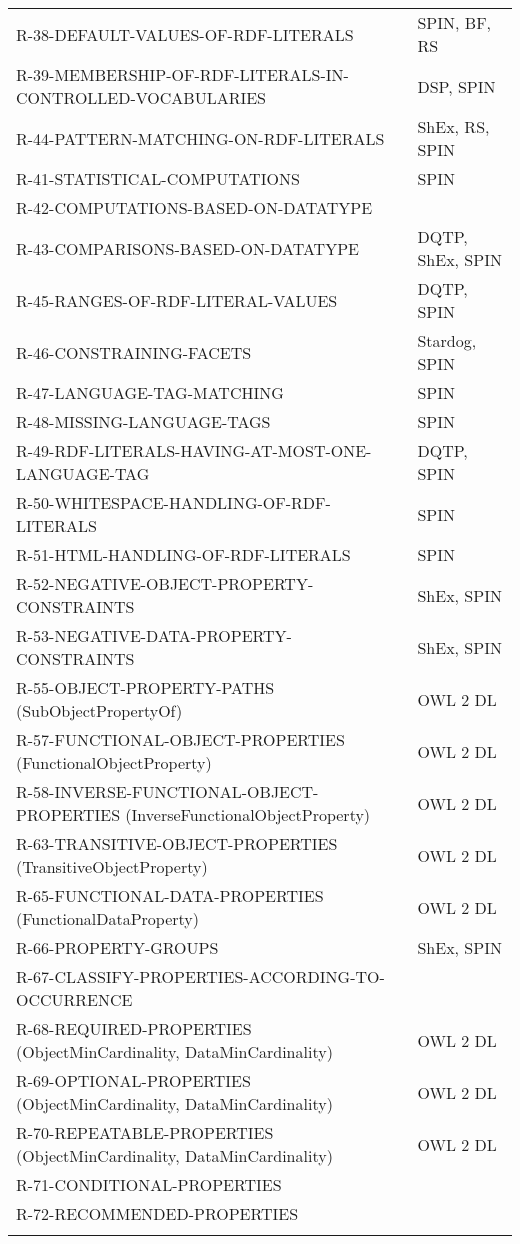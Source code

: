 \documentclass{llncs}
\newcommand{\hr}{\hline\noalign{\smallskip}} %
\begin{document}
\begin{table}
\begin{tabular}{ll}
R-38-DEFAULT-VALUES-OF-RDF-LITERALS & SPIN, BF, RS \\
R-39-MEMBERSHIP-OF-RDF-LITERALS-IN-CONTROLLED-VOCABULARIES & DSP, SPIN \\
R-44-PATTERN-MATCHING-ON-RDF-LITERALS & ShEx, RS, SPIN \\
R-41-STATISTICAL-COMPUTATIONS & SPIN \\
R-42-COMPUTATIONS-BASED-ON-DATATYPE & \\
R-43-COMPARISONS-BASED-ON-DATATYPE & DQTP, ShEx, SPIN \\
R-45-RANGES-OF-RDF-LITERAL-VALUES & DQTP, SPIN \\
R-46-CONSTRAINING-FACETS & Stardog, SPIN \\
R-47-LANGUAGE-TAG-MATCHING & SPIN \\
R-48-MISSING-LANGUAGE-TAGS & SPIN \\
R-49-RDF-LITERALS-HAVING-AT-MOST-ONE-LANGUAGE-TAG & DQTP, SPIN \\
R-50-WHITESPACE-HANDLING-OF-RDF-LITERALS & SPIN \\
R-51-HTML-HANDLING-OF-RDF-LITERALS & SPIN \\
R-52-NEGATIVE-OBJECT-PROPERTY-CONSTRAINTS & ShEx, SPIN \\
R-53-NEGATIVE-DATA-PROPERTY-CONSTRAINTS & ShEx, SPIN \\
R-55-OBJECT-PROPERTY-PATHS (SubObjectPropertyOf) & OWL 2 DL \\
R-57-FUNCTIONAL-OBJECT-PROPERTIES (FunctionalObjectProperty) & OWL 2 DL \\
R-58-INVERSE-FUNCTIONAL-OBJECT-PROPERTIES (InverseFunctionalObjectProperty) & OWL 2 DL \\
R-63-TRANSITIVE-OBJECT-PROPERTIES (TransitiveObjectProperty) & OWL 2 DL \\
R-65-FUNCTIONAL-DATA-PROPERTIES (FunctionalDataProperty) & OWL 2 DL \\
R-66-PROPERTY-GROUPS & ShEx, SPIN \\
R-67-CLASSIFY-PROPERTIES-ACCORDING-TO-OCCURRENCE & \\
R-68-REQUIRED-PROPERTIES (ObjectMinCardinality, DataMinCardinality) & OWL 2 DL \\
R-69-OPTIONAL-PROPERTIES  (ObjectMinCardinality, DataMinCardinality) & OWL 2 DL \\
R-70-REPEATABLE-PROPERTIES (ObjectMinCardinality, DataMinCardinality) & OWL 2 DL \\
R-71-CONDITIONAL-PROPERTIES \\
R-72-RECOMMENDED-PROPERTIES \\
\hr
\end{tabular}
\end{table}
\end{document}
